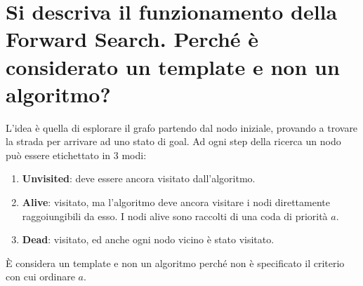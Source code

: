 \documentclass[\main/main.tex]{subfiles}
\begin{document}
\section{Si descriva il funzionamento della Forward Search.  Perché è considerato un template e non un algoritmo?}
L'idea è quella di esplorare il grafo partendo dal nodo iniziale, provando a trovare la strada per arrivare ad uno stato di goal. Ad ogni step della ricerca un nodo può essere etichettato in 3 modi:

\begin{enumerate}
\item \textbf{Unvisited}: deve essere ancora visitato dall'algoritmo.
\item \textbf{Alive}: visitato, ma l'algoritmo deve ancora visitare i nodi direttamente raggoiungibili da esso. I nodi alive sono raccolti di una coda di priorità $a$.
\item \textbf{Dead}: visitato, ed anche ogni nodo vicino è stato visitato.
\end{enumerate}

È considera un template e non un algoritmo perché non è specificato il criterio con cui ordinare $a$.

%
%            
%
\end{document}
